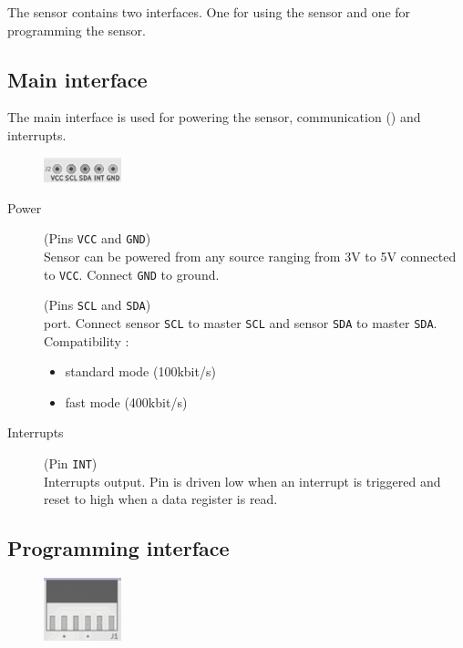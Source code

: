 The sensor contains two interfaces. One for using the sensor and one for programming the sensor.
\begin{multicols}{2}
\subsection{Main interface}
The main interface is used for powering the sensor, communication (\iic) and interrupts.
\begin{figure}[H]
 \centering
 \includegraphics[width=0.2\textwidth]{../img/J2.png}
\end{figure}

\begin{description}
	\item[Power] (Pins \texttt{VCC} and \texttt{GND}) \\
	Sensor can be powered from any source ranging from 3V to 5V connected to \texttt{VCC}. Connect \texttt{GND} to ground. 
	
	\item[\iic] (Pins \texttt{SCL} and \texttt{SDA}) \\
	\iic port. Connect sensor \texttt{SCL} to master \texttt{SCL} and sensor \texttt{SDA} to master \texttt{SDA}.\\
	Compatibility :
	\begin{itemize}
		\item standard mode (100kbit/s)
		\item fast mode (400kbit/s)
	\end{itemize}
	
	\item[Interrupts] (Pin \texttt{INT}) \\
	Interrupts output. Pin is driven low when an interrupt is triggered and reset to high when a data register is read.
\end{description}


\columnbreak

\subsection{Programming interface}
\begin{figure}[H]
 \centering
 \includegraphics[width=0.2\textwidth]{../img/J1.png}
\end{figure}


\end{multicols}
